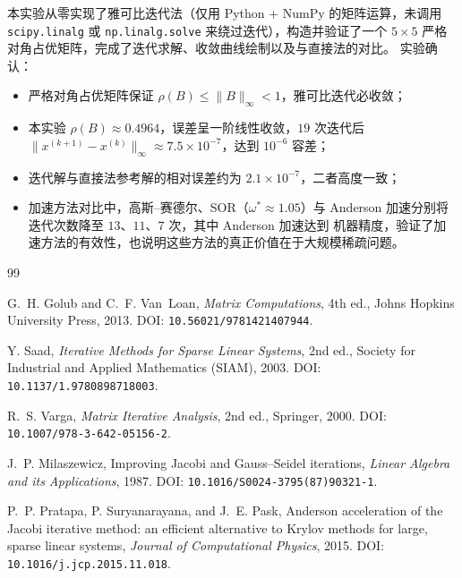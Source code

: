 \documentclass[12pt,a4paper]{ctexart}
\begin{document}
本实验从零实现了雅可比迭代法（仅用 Python + NumPy 的矩阵运算，未调用
\verb|scipy.linalg| 或 \verb|np.linalg.solve| 来绕过迭代），构造并验证了一个
$5\times5$ 严格对角占优矩阵，完成了迭代求解、收敛曲线绘制以及与直接法的对比。
实验确认：
\begin{itemize}
  \item 严格对角占优矩阵保证 $\rho(B)\le\|B\|_{\infty}<1$，雅可比迭代必收敛；
  \item 本实验 $\rho(B)\approx0.4964$，误差呈一阶线性收敛，$19$ 次迭代后
    $\|x^{(k+1)}-x^{(k)}\|_{\infty}\approx 7.5\times10^{-7}$，达到 $10^{-6}$ 容差；
  \item 迭代解与直接法参考解的相对误差约为 $2.1\times10^{-7}$，二者高度一致；
  \item 加速方法对比中，高斯--赛德尔、SOR（$\omega^{\ast}\approx1.05$）与
    Anderson 加速分别将迭代次数降至 $13$、$11$、$7$ 次，其中 Anderson 加速达到
    机器精度，验证了加速方法的有效性，也说明这些方法的真正价值在于大规模稀疏问题。
\end{itemize}

\begin{thebibliography}{99}

G.~H. Golub and C.~F. Van~Loan, \emph{Matrix Computations}, 4th ed.,
Johns Hopkins University Press, 2013. DOI: \texttt{10.56021/9781421407944}.

Y. Saad, \emph{Iterative Methods for Sparse Linear Systems}, 2nd ed.,
Society for Industrial and Applied Mathematics (SIAM), 2003.
DOI: \texttt{10.1137/1.9780898718003}.

R.~S. Varga, \emph{Matrix Iterative Analysis}, 2nd ed., Springer, 2000.
DOI: \texttt{10.1007/978-3-642-05156-2}.

J.~P. Milaszewicz, Improving Jacobi and Gauss--Seidel iterations,
\emph{Linear Algebra and its Applications}, 1987.
DOI: \texttt{10.1016/S0024-3795(87)90321-1}.

P.~P. Pratapa, P. Suryanarayana, and J.~E. Pask, Anderson acceleration of the
Jacobi iterative method: an efficient alternative to Krylov methods for large,
sparse linear systems, \emph{Journal of Computational Physics}, 2015.
DOI: \texttt{10.1016/j.jcp.2015.11.018}.

\end{thebibliography}
\end{document}

